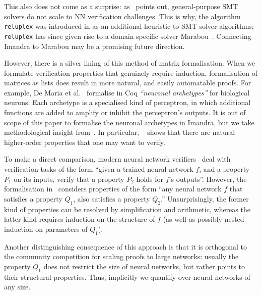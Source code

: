 \documentclass[runningheads]{llncs}
\begin{document}
 This also does not come as a surprise: as~\cite{KaBaDiJuKo17Reluplex} points out, general-purpose SMT solvers do not scale to NN verification challenges.
This is why, the algorithm \lstinline{reluplex} was introduced in \cite{KaBaDiJuKo17Reluplex} as an additional heuristic to SMT solver algorithms;
\lstinline{reluplex} has since given rise to a domain specific solver Marabou~\cite{KatzHIJLLSTWZDK19}.
Connecting Imandra to Marabou may be a promising future direction. 

However, there is a silver lining of this method of matrix formalisation.  When we formulate verification properties that genuinely require induction, formalisation of matrices as lists does result in more natural, and easily automatable proofs. For example, De Maria et al.~\cite{MariaBLFGRG22} formalise in Coq \emph{``neuronal
archetypes''} for biological neurons. Each archetype is a specialised kind of
perceptron, in which additional functions are added to amplify or inhibit the
perceptron's outputs. It is out of scope of this paper to formalise the neuronal
archetypes in Imandra, but we take methodological insight
from~\cite{MariaBLFGRG22}. In particular, ~\cite{MariaBLFGRG22} shows that there
are natural higher-order properties that one may want to verify.

To make a direct comparison, modern neural network
verifiers~\cite{KaBaDiJuKo17Reluplex,SinghGPV19} deal with verification tasks of
the form ``given a trained neural network $f$, and a property $P_1$ on its
inputs, verify that a property $P_2$ holds for $f$'s outputs''. However, the
formalisation in~\cite{MariaBLFGRG22} considers properties of the form ``any
neural network $f$ that satisfies a property $Q_1$, also satisfies a property
$Q_2$.'' Unsurprisingly, the former kind of properties can be resolved by
simplification and arithmetic, whereas the latter kind requires
induction on the structure of $f$ (as well as possibly nested induction on
parameters of $Q_1$).

Another distinguishing consequence of this approach is that it is orthogonal to
the community competition for scaling proofs to large networks: usually the
property $Q_1$ does not restrict the size of neural networks, but rather points
to their structural properties. Thus, implicitly we quantify over neural
networks of any size.
\end{document}
